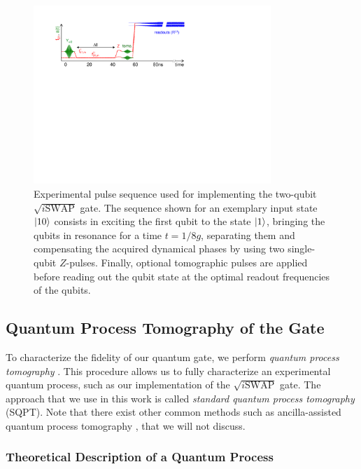 \begin{figure}[ht!]
	\centering
		\includegraphics[width=0.8\textwidth]{./material/figures/measurement/qubit_iswap_full}
	\caption{Experimental pulse sequence used for implementing the two-qubit $\sqrt{i\mathrm{SWAP}}$ gate. The sequence shown for an exemplary input state $\left| 10 \right>$ consists in exciting the first qubit to the state $\left| 1 \right>$, bringing the qubits in resonance for a time $t=1/8g$, separating them and compensating the acquired dynamical phases by using two single-qubit $Z$-pulses. Finally, optional tomographic pulses are applied before reading out the qubit state at the optimal readout frequencies of the qubits.}
	\label{fig:iswap_pulse_sequence}
\end{figure}


\subsection{Quantum Process Tomography of the Gate}

To characterize the fidelity of our quantum gate, we perform {\it quantum process tomography} \citep{poyatos_complete_1997}. This procedure allows us to fully characterize an experimental quantum process, such as our implementation of the $\sqrt{i\mathrm{SWAP}}$ gate. The approach that we use in this work is called {\it standard quantum process tomography} (SQPT). Note that there exist other common methods such as ancilla-assisted quantum process tomography \citep{dur_nonlocal_2001,dariano_quantum_2001,altepeter_ancilla-assisted_2003}, that we will not discuss.

\subsubsection{Theoretical Description of a Quantum Process}

